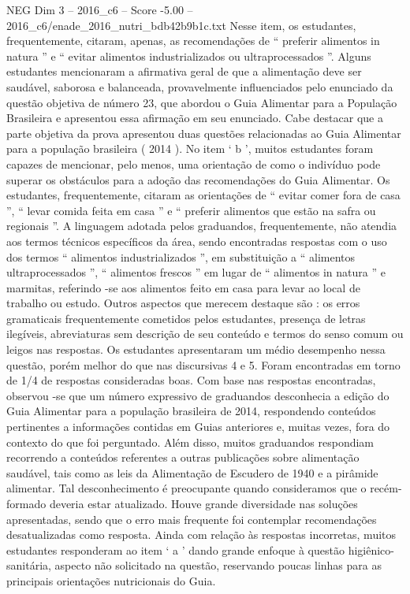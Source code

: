 \begin{textsample}{NEG Dim 3 – 2016\_c6 – Score -5.00 – 2016\_c6/enade\_2016\_nutri\_bdb42b9b1c.txt}
Nesse item, os estudantes, frequentemente, citaram, apenas, as recomendações de “ preferir alimentos in natura ” e “ evitar alimentos industrializados ou ultraprocessados ”.
Alguns estudantes mencionaram a afirmativa geral de que a alimentação deve ser saudável, saborosa e balanceada, provavelmente influenciados pelo enunciado da questão objetiva de número 23, que abordou o Guia Alimentar para a População Brasileira e apresentou essa afirmação em seu enunciado.
Cabe destacar que a parte objetiva da prova apresentou duas questões relacionadas ao Guia Alimentar para a população brasileira ( 2014 ).
No item ‘ b ’, muitos estudantes foram capazes de mencionar, pelo menos, uma orientação de como o indivíduo pode superar os obstáculos para a adoção das recomendações do Guia Alimentar.
Os estudantes, frequentemente, citaram as orientações de “ evitar comer fora de casa ”, “ levar comida feita em casa ” e “ preferir alimentos que estão na safra ou regionais ”.
A linguagem adotada pelos graduandos, frequentemente, não atendia aos termos técnicos específicos da área, sendo encontradas respostas com o uso dos termos “ alimentos industrializados ”, em substituição a “ alimentos ultraprocessados ”, “ alimentos frescos ” em lugar de “ alimentos in natura ” e marmitas, referindo -se aos alimentos feito em casa para levar ao local de trabalho ou estudo.
Outros aspectos que merecem destaque são : os erros gramaticais frequentemente cometidos pelos estudantes, presença de letras ilegíveis, abreviaturas sem descrição de seu conteúdo e termos do senso comum ou leigos nas respostas.
Os estudantes apresentaram um médio desempenho nessa questão, porém melhor do que nas discursivas 4 e 5.
Foram encontradas em torno de 1/4 de respostas consideradas boas.
Com base nas respostas encontradas, observou -se que um número expressivo de graduandos desconhecia a edição do Guia Alimentar para a população brasileira de 2014, respondendo conteúdos pertinentes a informações contidas em Guias anteriores e, muitas vezes, fora do contexto do que foi perguntado.
Além disso, muitos graduandos respondiam recorrendo a conteúdos referentes a outras publicações sobre alimentação saudável, tais como as leis da Alimentação de Escudero de 1940 e a pirâmide alimentar.
Tal desconhecimento é preocupante quando consideramos que o recém-formado deveria estar atualizado.
Houve grande diversidade nas soluções apresentadas, sendo que o erro mais frequente foi contemplar recomendações desatualizadas como resposta.
Ainda com relação às respostas incorretas, muitos estudantes responderam ao item ‘ a ’ dando grande enfoque à questão higiênico-sanitária, aspecto não solicitado na questão, reservando poucas linhas para as principais orientações nutricionais do Guia.

\end{textsample}
